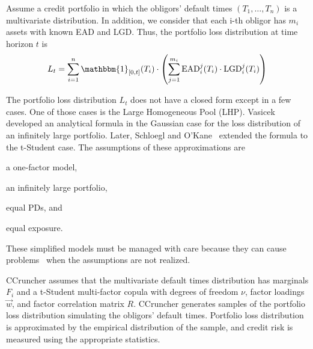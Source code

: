 \documentclass[11pt,fleqn]{book} %
\begin{document}
Assume a credit portfolio in which the obligors' default times 
$(T_1,\dots,T_n)$ is a multivariate distribution. In addition, we consider 
that each i-th obligor has $m_i$ assets with known EAD and LGD\@. Thus, 
the portfolio loss distribution at time horizon $t$ is
\begin{displaymath}
	L_t = \displaystyle \sum_{i=1}^n \mathbbm{1}_{[0,t]}(T_i) \cdot 
	\left( 
	\sum_{j=1}^{m_i} \text{EAD}_i^j(T_i) \cdot \text{LGD}_i^j(T_i)
	\right)
\end{displaymath}

The portfolio loss distribution $L_t$ does not have a closed form except 
in a few cases. One of those cases is the Large Homogeneous Pool (LHP).
Vasicek~\cite{vasicek:1987} developed an analytical formula in the Gaussian 
case for the loss distribution of an infinitely large portfolio. Later, 
Schloegl and O'Kane~\cite{schloegl:2005} extended the formula to the 
t-Student case. The assumptions of these approximations are 
\begin{inparaenum}[1)]
	\item a one-factor model, 
	\item an infinitely large portfolio, 
	\item equal PDs, and
	\item equal exposure.
\end{inparaenum}
These simplified models must be managed with care because they can cause 
problems~\cite{long:2012} when the assumptions are not realized.

CCruncher assumes that the multivariate default times distribution has
marginals $F_i$ and a t-Student multi-factor copula with degrees 
of freedom $\nu$, factor loadings $\vec{w}$, and factor correlation matrix 
$R$. CCruncher generates samples of the portfolio loss distribution simulating 
the obligors' default times. Portfolio loss distribution is approximated by the 
empirical distribution of the sample, and credit risk is measured using the 
appropriate statistics.
\end{document}
